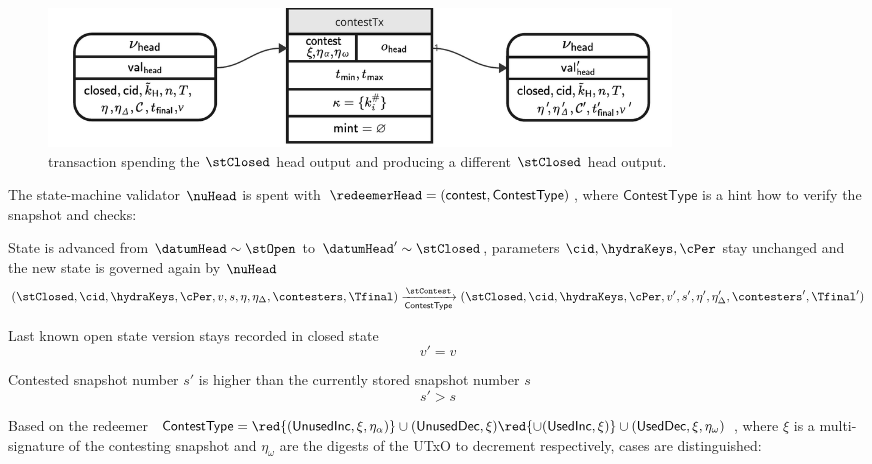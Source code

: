 \begin{figure}
  \includegraphics[width=0.8\textwidth]{Hydra/Protocol/Figures/contestTx.pdf}
  \caption{\mtxContest{} transaction spending the $\stClosed$ head output and
	producing a different $\stClosed$ head output.}\label{fig:contestTx}
\end{figure}

\noindent The state-machine validator $\nuHead$ is spent with
$\redeemerHead = (\mathsf{contest}, \mathsf{ContestType})$, where
$\mathsf{ContestType}$ is a hint how to verify the snapshot and checks:
\begin{menumerate}
  \item State is advanced from $\datumHead \sim \stOpen$ to
  $\datumHead' \sim \stClosed$, parameters $\cid,\hydraKeys,\cPer$
  stay unchanged and the new state is governed again by $\nuHead$
  \[
	(\stClosed,\cid,\hydraKeys,\cPer,v,s,\eta,\eta_{\Delta},\contesters,\Tfinal) \xrightarrow[\mathsf{ContestType}]{\stContest} (\stClosed,\cid,\hydraKeys,\cPer,v',s',\eta',\eta_{\Delta}',\contesters',\Tfinal')
  \]

  \item Last known open state version stays recorded in closed state
  \[
	v' = v
  \]

  \item Contested snapshot number $s'$ is higher than the currently stored snapshot number $s$
  \[
	s' > s
  \]
  \item Based on the redeemer $\mathsf{ContestType} = \red{(\mathsf{UnusedInc}, \xi, \eta_\alpha)} \cup (\mathsf{UnusedDec}, \xi) \red{\cup (\mathsf{UsedInc}, \xi)}  \cup (\mathsf{UsedDec}, \xi, \eta_\omega)$, where $\xi$ is a multi-signature of the contesting snapshot  and $\eta_\omega$ are the digests of the UTxO to  decrement respectively,  cases are distinguished:

  \begin{menumerate}
	\item {}


\end{menumerate}
\end{menumerate}
